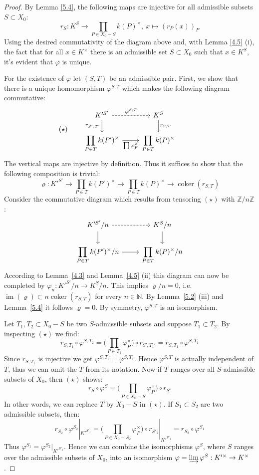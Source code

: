 \begin{proof}
By Lemma \ref{5.4}, the following maps are injective for all admissible subsets $S\subset X_0$:
\[ r_S:K^S \to\prod_{P\in X_0 -  S} k(P)^\times,\ x\mapsto (r_P(x))_P \]
Using the desired commutativity of the diagram above and, with Lemma \ref{4.5} (i), the fact that for all $x\in K^\times$ there is an admissible set $S\subset X_0$ such that $x\in K^S$, it's evident that $\varphi$ is unique. 

For the existence of $\varphi$ let $(S,T)$ be an admissible pair. First, we show that there is a unique homomorphism $\varphi^{S,T}$ which makes the following diagram commutative:
\[ (\star) \qquad \begin{tikzcd}
K'^{S'} \rar["\varphi^{S,T}", dashed] \dar["r_{S',T'}"'] & K^S \dar["r_{S,T}"]\\
\displaystyle \prod_{P\in T}k(P')^\times \rar["\prod\varphi_P^\times"'] & \displaystyle \prod_{P\in T}k(P)^\times
\end{tikzcd} \phantom{\qquad (\star)} \]
The vertical maps are injective by definition. Thus it suffices to show that the following composition is trivial:
\[\varrho:K'^{S'}\longrightarrow\prod_{P\in T} k(P')^\times \longrightarrow \prod_{P\in T} k(P)^\times\longrightarrow\operatorname{coker}(r_{S,T})\] 
Consider the commutative diagram which results from tensoring $(\star)$ with $\mathbb{Z}/n\mathbb{Z}$:
\[ \begin{tikzcd}
K'^{S'}/n \rar[dashed]\dar & K^S/n\dar\\
\displaystyle \prod_{P\in T}k(P')^\times/n \rar & \displaystyle \prod_{P\in T}k(P)^\times/n
\end{tikzcd} \]
According to Lemma~\ref{4.3} and Lemma~\ref{4.5} (ii) this diagram can now be completed by $\varphi_n: K'^{S'}/n\to K^S/n$. This implies $\varrho/n=0$, i.e. $\operatorname{im}(\varrho)\subset n\operatorname{coker}(r_{S,T})$ for every $n\in\mathbb{N}$. By Lemma~\ref{5.2} (iii) and Lemma~\ref{5.4} it follows $\varrho = 0$. By symmetry, $\varphi^{S,T}$ is an isomorphism.

Let $T_1, T_2\subset X_0 -  S$ be two $S$-admissible subsets and suppose $T_1\subset T_2$. By inspecting $(\star)$ we find:
\[ r_{S,T_1}\circ\varphi^{S,T_2}=\Big(\prod_{P\in T_1}\varphi_P^\times\Big)\circ r_{S',T_1'} = r_{S,T_1}\circ\varphi^{S,T_1} \]
Since $r_{S,T_1}$ is injective we get $\varphi^{S,T_2}=\varphi^{S,T_1}$. Hence $\varphi^{S,T}$ is actually independent of $T$, thus we can omit the $T$ from its notation. Now if $T$ ranges over all $S$-admissible subsets of $X_0$, then $(\star)$ shows:
\[ r_S\circ\varphi^S = \Big(\prod_{P\in X_0 -  S}\varphi_P^\times \Big)\circ r_{S'} \]
In other words, we can replace $T$ by $X_0 -  S$ in $(\star)$. If $S_1\subset S_2$ are two admissible subsets, then:
\[ r_{S_2}\circ\varphi^{S_2}|_{K'^{S'_1}} = \Big(\prod_{P\in X_0 -  S_2}\varphi_P^\times \Big)\circ r_{S'_2}|_{K'^{S'_1}} = r_{S_2}\circ\varphi^{S_1} \]
Thus $\varphi^{S_1}=\varphi^{S_2}|_{K'^{S'_1}}$. Hence we can combine the isomorphisms $\varphi^S$, where $S$ ranges over the admissible subsets of $X_0$, into an isomorphism $\varphi = \varinjlim \varphi^S: K'^\times \to K^\times$. 


\end{proof}
